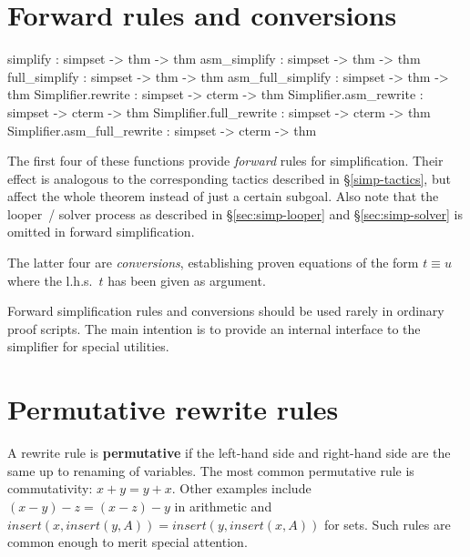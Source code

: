 \section{Forward rules and conversions}
\begin{ttbox}
simplify          : simpset -> thm -> thm
asm_simplify      : simpset -> thm -> thm
full_simplify     : simpset -> thm -> thm
asm_full_simplify : simpset -> thm -> thm\medskip
Simplifier.rewrite           : simpset -> cterm -> thm
Simplifier.asm_rewrite       : simpset -> cterm -> thm
Simplifier.full_rewrite      : simpset -> cterm -> thm
Simplifier.asm_full_rewrite  : simpset -> cterm -> thm
\end{ttbox}

The first four of these functions provide \emph{forward} rules for
simplification.  Their effect is analogous to the corresponding
tactics described in {\S}\ref{simp-tactics}, but affect the whole
theorem instead of just a certain subgoal.  Also note that the
looper~/ solver process as described in {\S}\ref{sec:simp-looper} and
{\S}\ref{sec:simp-solver} is omitted in forward simplification.

The latter four are \emph{conversions}, establishing proven equations
of the form $t \equiv u$ where the l.h.s.\ $t$ has been given as
argument.

\begin{warn}
  Forward simplification rules and conversions should be used rarely
  in ordinary proof scripts.  The main intention is to provide an
  internal interface to the simplifier for special utilities.
\end{warn}


\section{Permutative rewrite rules}

A rewrite rule is {\bf permutative} if the left-hand side and right-hand
side are the same up to renaming of variables.  The most common permutative
rule is commutativity: $x+y = y+x$.  Other examples include $(x-y)-z =
(x-z)-y$ in arithmetic and $insert(x,insert(y,A)) = insert(y,insert(x,A))$
for sets.  Such rules are common enough to merit special attention.

